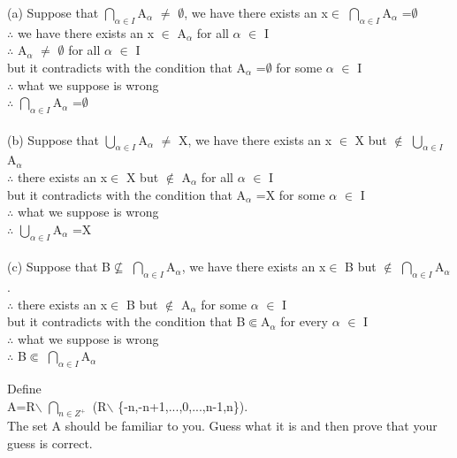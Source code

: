 \documentclass[11pt, a4paper, UTF8]{ctexart}
\begin{document}
\begin{solution}
(a) Suppose that $\bigcap_{\alpha \in I}$A$_\alpha$ $\not=$ $\emptyset$, we have there exists an x$\in$ $\bigcap_{\alpha \in I}$A$_\alpha$ =$\emptyset$\\
$\therefore$ we have there exists an x $\in$ A$_\alpha$ for all $\alpha$ $\in$ I\\
$\therefore$ A$_\alpha$ $\not=$ $\emptyset$ for all $\alpha$ $\in$ I\\
but it contradicts with the condition that A$_\alpha$ =$\emptyset$ for some $\alpha$ $\in$ I\\
$\therefore$ what we suppose is wrong \\
$\therefore$ $\bigcap_{\alpha \in I}$A$_\alpha$ =$\emptyset$\\
\\
(b) Suppose that $\bigcup_{\alpha \in I}$A$_\alpha$ $\not=$ X, we have there exists an x $\in$ X but $\notin$ $\bigcup_{\alpha \in I}$A$_\alpha$\\
$\therefore$ there exists an x$\in$ X but $\notin$ A$_\alpha$ for all $\alpha$ $\in$ I\\
but it contradicts with the condition that A$_\alpha$ =X for some $\alpha$ $\in$ I\\
$\therefore$ what we suppose is wrong\\
$\therefore$ $\bigcup_{\alpha \in I}$A$_\alpha$ =X\\
\\
(c) Suppose that B$\nsubseteq$ $\bigcap_{\alpha \in I}$A$_\alpha$, we have there exists an x$\in$ B but $\notin$ $\bigcap_{\alpha \in I}$A$_\alpha$.\\
$\therefore$ there exists an x$\in$ B but $\notin$ A$_\alpha$ for some $\alpha$ $\in$ I\\
but it contradicts with the condition that B$\Subset$A$_\alpha$ for every $\alpha$ $\in$ I\\
$\therefore$ what we suppose is wrong\\
$\therefore$ B$\Subset$ $\bigcap_{\alpha \in I}$A$_\alpha$
\end{solution}








\begin{problem}[UD:8.8]
Define\\
\indent \indent A=R$\backslash$ $\bigcap_{n\in Z^+}$ (R$\backslash$ \{-n,-n+1,...,0,...,n-1,n\}).\\
The set A should be familiar to you. Guess what it is and then prove that your guess is correct.
\end{problem}
\end{document}
